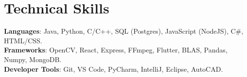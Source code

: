 \documentclass[letterpaper,11pt]{article}
\begin{document}
%
\section{Technical Skills}
 \begin{itemize}[leftmargin=0.15in, label={}]
    \small{\item{
     \textbf{Languages}{: Java, Python, C/C++, SQL (Postgres), JavaScript (NodeJS), C\#, HTML/CSS.} \\
     \textbf{Frameworks}{: OpenCV, React, Express, FFmpeg, Flutter, BLAS, Pandas, Numpy, MongoDB.} \\
     \textbf{Developer Tools}{: Git, VS Code, PyCharm, IntelliJ, Eclipse, AutoCAD.} \\
    }}
 \end{itemize}


\end{document}
